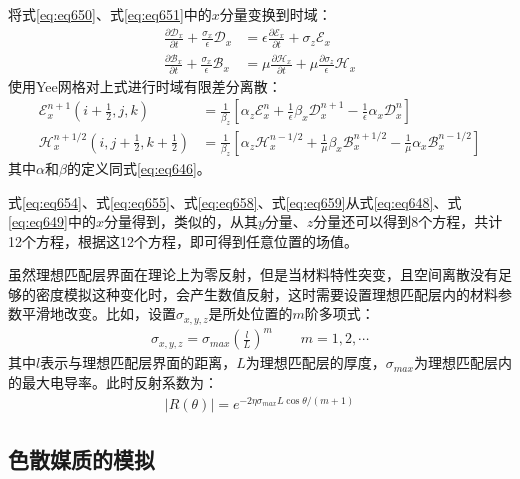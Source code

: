 \documentclass{article}
\numberwithin{equation}{section}
\begin{document}
将式\ref{eq:eq650}、式\ref{eq:eq651}中的$x$分量变换到时域：
\begin{align}
    \label{eq:eq656}
    \frac{\partial \mathcal{D}_x}{\partial t}+\frac{\sigma_x}{\epsilon}\mathcal{D}_x&=\epsilon\frac{\partial \mathcal{E}_x}{\partial t}+\sigma_z\mathcal{E}_x \\
    \label{eq:eq657}
    \frac{\partial \mathcal{B}_x}{\partial t}+\frac{\sigma_x}{\epsilon}\mathcal{B}_x&=\mu\frac{\partial \mathcal{H}_x}{\partial t}+\mu\frac{\partial\sigma_z}{\epsilon}\mathcal{H}_x
\end{align}
使用Yee网格对上式进行时域有限差分离散：
\begin{align}
    \label{eq:eq658}
    \mathcal{E}_x^{n+1}\left(i+\frac{1}{2},j,k\right)&=\frac{1}{\beta_z}\left[\alpha_z\mathcal{E}_x^n+\frac{1}{\epsilon}\beta_x\mathcal{D}_x^{n+1}-\frac{1}{\epsilon}\alpha_x\mathcal{D}_x^{n}\right] \\
    \label{eq:eq659}
    \mathcal{H}_x^{n+1/2}\left(i,j+\frac{1}{2},k+\frac{1}{2}\right)&=\frac{1}{\beta_z}\left[\alpha_z\mathcal{H}_x^{n-1/2}+\frac{1}{\mu}\beta_x\mathcal{B}_x^{n+1/2}-\frac{1}{\mu}\alpha_x\mathcal{B}_x^{n-1/2}\right]
\end{align}
其中$\alpha$和$\beta$的定义同式\ref{eq:eq646}。\par
式\ref{eq:eq654}、式\ref{eq:eq655}、式\ref{eq:eq658}、式\ref{eq:eq659}从式\ref{eq:eq648}、式\ref{eq:eq649}中的$x$分量得到，类似的，从其$y$分量、$z$分量还可以得到8个方程，共计12个方程，根据这12个方程，即可得到任意位置的场值。\par
虽然理想匹配层界面在理论上为零反射，但是当材料特性突变，且空间离散没有足够的密度模拟这种变化时，会产生数值反射，这时需要设置理想匹配层内的材料参数平滑地改变。比如，设置$\sigma_{x,y,z}$是所处位置的$m$阶多项式：
\begin{align}
    \label{eq:eq660}
    \sigma_{x,y,z}=\sigma_{max}\left(\frac{l}{L}\right)^m\qquad m=1,2,\cdots
\end{align}
其中$l$表示与理想匹配层界面的距离，$L$为理想匹配层的厚度，$\sigma_{max}$为理想匹配层内的最大电导率。此时反射系数为：
\begin{align}
    \label{eq:eq661}
    |R(\theta)|=e^{-2\eta\sigma_{max}L\cos\theta/(m+1)}
\end{align}
\subsection{色散媒质的模拟}
\end{document}
